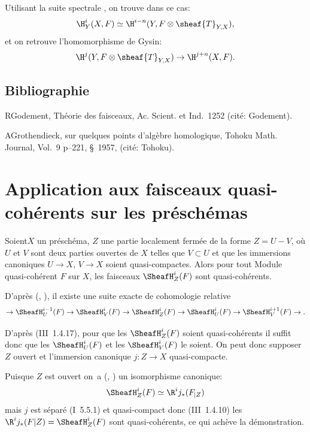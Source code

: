 Utilisant la suite spectrale , on trouve dans ce cas:
\begin{equation} \label{eq:I.31}
\H^i_Y(X, F)\simeq \H^{i-n}(Y, F\otimes \sheaf{T}_{Y, X}),
\end{equation}
et on retrouve l'\og homomorphisme de Gysin\label{hgysin}\fg:
\begin{equation} \label{eq:I.32} {\H^j(Y, F\otimes \sheaf{T}_{Y, X}) \to \H^{j+n}(X, F)}.
\end{equation}

%
\section*{Bibliographie}
\noindent
R\ptbl Godement, Th\'eorie des faisceaux, Ac. Scient. et Ind.~1252 (cit\'e: Godement).
\par\smallskip\noindent
A\ptbl Grothendieck, sur quelques points d'alg\`ebre homologique, Tohoku Math. Journal, Vol.~9 p--221, \S~1957, (cit\'e: Tohoku).


\chapter[Faisceaux quasi-coh\'erents sur les pr\'esch\'emas]{Application aux faisceaux quasi-coh\'erents sur les pr\'esch\'emas} \label{II}


\begin{supproposition} \label{II.1}
Soient\pageoriginale $X$ un pr\'esch\'ema, $Z$ une partie localement ferm\'ee de la forme $Z=U-V$, o\`u $U$ et $V$ sont deux parties ouvertes de $X$ telles que $V\subset U$ et que les immersions canoniques $U\to X$, $V\to X$ soient quasi-compactes. Alors pour tout Module quasi-coh\'erent $F$ sur $X$, les faisceaux ${\SheafH}_Z^i(F)$ sont quasi-coh\'erents.
\end{supproposition}

D'apr\`es (, ), il existe une suite exacte de cohomologie relative
$$
\to {\SheafH}_U^{i-1}(F) \to {\SheafH}_V^{i}(F) \to {\SheafH}_Z^{i}(F) \to {\SheafH}_U^{i}(F) \to {\SheafH}_V^{i+1}(F) \to.
$$

D'apr\`es (\EGA III~1.4.17), pour que les ${\SheafH}_Z^i(F)$ soient quasi-coh\'erents il suffit donc que les ${\SheafH}_U^i(F)$ et les ${\SheafH}_V^i(F)$ le soient. On peut donc supposer $Z$ ouvert et l'immersion canonique $j:Z\to X$ quasi-compacte.

Puisque $Z$ est ouvert on~a (, ) un isomorphisme canonique:
$$
{\SheafH}_Z^{i}(F) \simeq \R^ij_{*}(F_{|Z})
$$
mais $j$ est s\'epar\'e (\EGA I~5.5.1) et quasi-compact donc (\EGA III~1.4.10) les $\R^ij_{*}(F|Z)={\SheafH}_Z^{i}(F)$ sont quasi-coh\'erents, ce qui ach\`eve la d\'emonstration.

